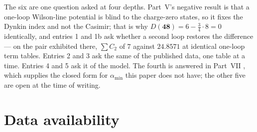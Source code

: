 \documentclass[11pt,a4paper]{article}
\newcommand{\rep}[1]{\mathbf{#1}}
\newcommand{\amin}{\alpha_{\min}}
\begin{document}
\medskip
\noindent
The six are one question asked at four depths. Part~V's negative result is that a one-loop
Wilson-line potential is blind to the charge-zero states, so it fixes the Dynkin index and not the
Casimir; that is why $D(\rep{48})=6-\tfrac34\cdot8=0$ identically, and entries 1 and 1b ask whether
a second loop restores the difference --- on the pair exhibited there, $\sum C_2$ of $7$ against
$24.8571$ at identical one-loop term tables. Entries 2 and 3 ask the same of the published data, one
table at a time. Entries 4 and 5 ask it of the model. The fourth is answered in Part~VII
\cite{PartVII}, which supplies the closed form for $\amin$ this paper does not have; the other five
are open at the time of writing.

\section*{Data availability}
\end{document}
